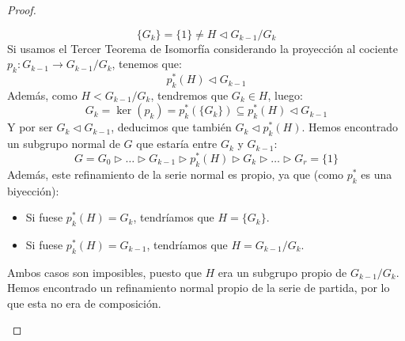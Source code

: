 \begin{prop}
\begin{proof}
\begin{description}
                \begin{equation*}
                    \{G_k\} = \{1\} \neq H \lhd G_{k-1}/G_k
                \end{equation*}
                Si usamos el Tercer Teorema de Isomorfía considerando la proyección al cociente $p_k:G_{k-1}\to G_{k-1}/G_k$, tenemos que:
                \begin{equation*}
                    p^\ast_k(H) \lhd G_{k-1}
                \end{equation*}
                Además, como $H < G_{k-1}/G_k$, tendremos que $G_k \in H$, luego:
                \begin{equation*}
                    G_k = \ker(p_k) = p_k^\ast(\{G_k\}) \subseteq p_k^\ast(H) \lhd G_{k-1}
                \end{equation*}
                Y por ser $G_k \lhd G_{k-1}$, deducimos que también $G_k\lhd p_k^\ast(H)$. Hemos encontrado un subgrupo normal de $G$ que estaría entre $G_k$ y $G_{k-1}$:
                \begin{equation*}
                    G = G_0 \rhd \ldots \rhd G_{k-1} \rhd p_k^\ast(H) \rhd G_k \rhd \ldots \rhd G_r = \{1\}
                \end{equation*}
                Además, este refinamiento de la serie normal es propio, ya que (como $p_k^\ast$ es una biyección):
                \begin{itemize}
                    \item Si fuese $p_k^\ast(H) = G_k$, tendríamos que $H = \{G_k\}$.
                    \item Si fuese $p_k^\ast(H) = G_{k-1}$, tendríamos que $H = G_{k-1}/G_k$.
                \end{itemize}
                Ambos casos son imposibles, puesto que $H$ era un subgrupo propio de $G_{k-1}/G_k$. Hemos encontrado un refinamiento normal propio de la serie de partida, por lo que esta no era de composición.
        \end{description}
    \end{proof}
\end{prop}

